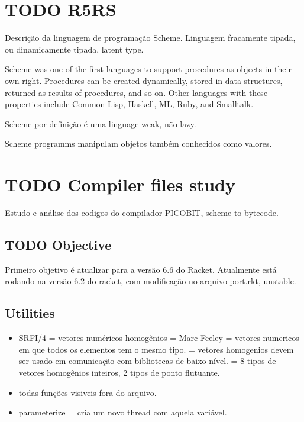 \documentclass[11pt]{article}
\begin{document}
\section{{\bfseries\sffamily TODO} R5RS}
\label{sec-6}

Descrição da linguagem de programação Scheme. Linguagem fracamente tipada, ou dinamicamente tipada, latent type.

Scheme was one of the first languages to support procedures as objects in their own right. Procedures can be created dynamically, stored in data structures, returned as results of procedures, and so on. Other languages with these properties include Common Lisp, Haskell, ML, Ruby, and Smalltalk.

Scheme por definição é uma linguage weak, não lazy.

Scheme programms manipulam objetos também conhecidos como valores. 

\section{{\bfseries\sffamily TODO} Compiler files study}
\label{sec-7}
Estudo e análise dos codigos do compilador PICOBIT, scheme to bytecode.

\subsection{{\bfseries\sffamily TODO} Objective}
\label{sec-7-1}
Primeiro objetivo é atualizar para a versão 6.6 do Racket. Atualmente está rodando na versão 6.2 do racket, com modificação no arquivo port.rkt, unstable.

\subsection{Utilities}
\label{sec-7-2}

\begin{itemize}
\item SRFI/4 = vetores numéricos homogênios
= Marc Feeley
= vetores numericos em que todos os elementos tem o mesmo tipo.
= vetores homogenios devem ser usado em comunicação com bibliotecas de baixo nível.
= 8 tipos de vetores homogênios inteiros, 2 tipos de ponto flutuante.

\item todas funções visiveis fora do arquivo.
\item parameterize = cria um novo thread com aquela variável.
\end{itemize}
\end{document}
